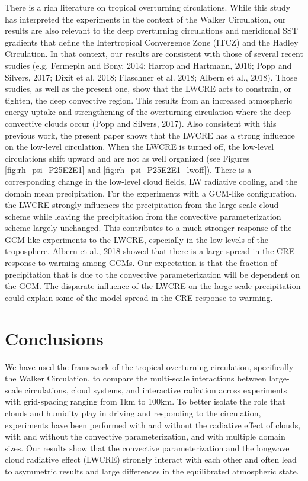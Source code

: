 \documentclass[draft]{agujournal2019}
\begin{document}
{There is a rich literature on tropical overturning circulations.  While this study has interpreted the experiments 
in the context of the Walker Circulation, our results are also relevant to the deep overturning circulations and 
meridional SST gradients that define the Intertropical Convergence Zone (ITCZ) and the Hadley Circulation.  
In that context, our results are consistent with those of several recent studies 
(e.g. Fermepin and Bony, 2014; Harrop and Hartmann, 2016; Popp and Silvers, 2017; Dixit et al. 2018; Flaschner et al. 2018; Albern et al., 2018).  
Those studies, as well as the present one, show that the LWCRE acts to constrain, or tighten, the deep convective region.  
This results from an increased atmospheric energy uptake and strengthening of the overturning circulation where the deep convective clouds occur (Popp and Silvers, 2017).  
Also consistent with this previous work, the present paper shows that the LWCRE has a strong influence on the low-level circulation.   
When the LWCRE is turned off, the low-level circulations shift upward and are not as well organized 
(see Figures \ref{fig:rh_psi_P25E2E1} and \ref{fig:rh_psi_P25E2E1_lwoff}).
There is a corresponding change in the low-level cloud fields, LW radiative cooling, and the domain mean precipitation.
For the experiments with a GCM-like configuration, the LWCRE strongly influences the precipitation from the large-scale
cloud scheme while leaving the precipitation from the convective parameterization scheme largely unchanged.  This 
contributes to a much stronger response of the GCM-like experiments to the LWCRE, especially in the low-levels of the 
troposphere.  
Albern et al., 2018 showed that there is a large spread in the CRE response to warming among GCMs.  
Our expectation is that the fraction of precipitation that is due to the convective parameterization will be dependent on the 
GCM.   The disparate influence of the LWCRE on the large-scale precipitation could explain some of the model
spread in the CRE response to warming.  



\section{Conclusions}


We have used the framework of the tropical overturning circulation, specifically the Walker Circulation, 
to compare the multi-scale interactions between large-scale circulations, cloud systems, and interactive 
radiation across experiments with grid-spacing ranging from 1km to 100km.   
To better isolate the role that clouds and humidity play in driving and responding to the 
circulation, experiments have been performed with and without the radiative effect of clouds, with and without the 
convective parameterization, and with multiple domain sizes.  Our results show that 
the convective parameterization and the longwave cloud radiative effect (LWCRE) strongly interact with each other and 
often lead to asymmetric results and large differences in the equilibrated atmospheric state.  

}
\end{document}
